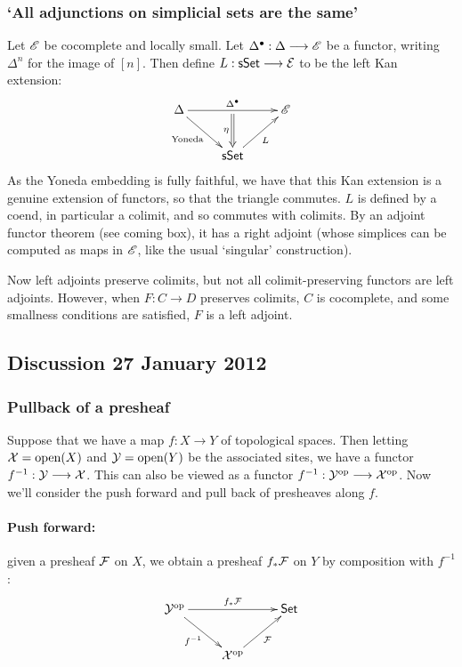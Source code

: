 \documentclass[11pt]{article}
\begin{document}
\begin{2. Kan Extensions}
\subsubsection*{`All adjunctions on simplicial sets are the same'}
Let $\mathscr{E}$ be cocomplete and locally small. Let $\Delta^\bullet:\Delta\longrightarrow\mathscr{E}$ be a functor, writing $\Delta^n$ for the image of $[n]$. Then define $L:\operatorname{{\mathsf{sSet}}}\longrightarrow\mathcal{E}$ to be the left Kan extension:
\[\xymatrix{
\Delta\ar[rd]_-{\textup{Yoneda}} 
\ar[rr]^-{\Delta^\bullet}_-{}="arF"&%
&%
\scrE\\%
&%
\sSet\ar@{->}[ur]_{L}\ar@{=>}"arF";[]_-{\eta}&%
}\]
As the Yoneda embedding is fully faithful, we have that this Kan extension is a genuine extension of functors, so that the triangle commutes. $L$ is defined by a coend, in particular a colimit, and so commutes with colimits. By an adjoint functor theorem (see coming box), it has a right adjoint (whose simplices can be computed as maps in $\mathscr{E}$, like the usual `singular' construction).
\begin{shaded}
Now left adjoints preserve colimits, but not all colimit-preserving functors are left adjoints. However, when $F:C\to D$ preserves colimits, $C$ is cocomplete, and some smallness conditions are satisfied, $F$ is a left adjoint.
\end{shaded}




\begin{shaded}
\subsection*{Discussion 27 January 2012}

\subsubsection*{Pullback of a presheaf}
 Suppose that we have a map $f:X\to Y$ of topological spaces. Then letting $\mathcal{X}=\textup{open}(X)$ and $\mathcal{Y}=\textup{open}(Y)$ be the associated sites, we have a functor $f^{-1}:\mathcal{Y}\longrightarrow\mathcal{X}$. This can also be viewed as a functor $f^{-1}:\mathcal{Y}^{\textup{op}}\longrightarrow\mathcal{X}^{\textup{op}}$. Now we'll consider the push forward and pull back of presheaves along $f$.

\paragraph*{Push forward:} given a presheaf $\mathcal{F}$ on $X$, we obtain a presheaf $f_*\mathcal{F}$ on $Y$ by composition with $f^{-1}$:
\[\vcenter{\xymatrix{
\calY^\op\ar[rd]_-{f^{-1}} \ar[rr]^-{f_*\calF}_-{}="arF"&%
&%
\Set\\%
&%
\calX^\op\ar@{->}[ur]_{\calF}%
}}
\]


\end{shaded}
\end{2. Kan Extensions}
\end{document}
